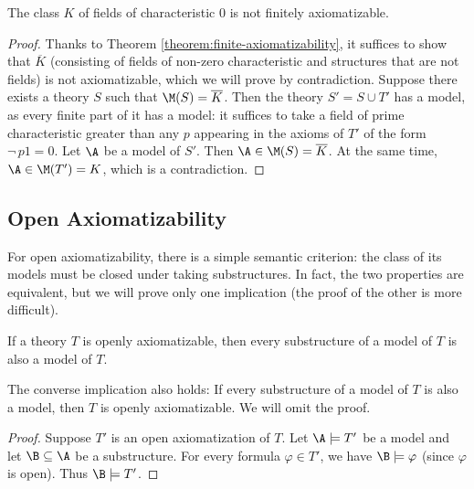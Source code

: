 \begin{proposition}
The class $K$ of fields of characteristic $0$ is not finitely axiomatizable.   
\end{proposition}
\begin{proof}
Thanks to Theorem \ref{theorem:finite-axiomatizability}, it suffices to show that $\overline{K}$ (consisting of fields of non-zero characteristic and structures that are not fields) is not axiomatizable, which we will prove by contradiction. Suppose there exists a theory $S$ such that $\M(S) = \overline{K}$. Then the theory 
$S' = S \cup T'$ has a model, as every finite part of it has a model: it suffices to take a field of prime characteristic greater than any $p$ appearing in the axioms of $T'$ of the form $\neg\, p1 = 0$. Let $\A$ be a model of $S'$. Then $\A \in \M(S) = \overline{K}$. At the same time, $\A \in \M(T') = K$, which is a contradiction.
\end{proof}

\subsection{Open Axiomatizability}

For open axiomatizability, there is a simple semantic criterion: the class of its models must be closed under taking substructures. In fact, the two properties are equivalent, but we will prove only one implication (the proof of the other is more difficult).

\begin{theorem}\label{theorem:open-axiomatizability}
If a theory $T$ is openly axiomatizable, then every substructure of a model of $T$ is also a model of $T$.   
\end{theorem}

\begin{remark}
    The converse implication also holds: If every substructure of a model of $T$ is also a model, then $T$ is openly axiomatizable. We will omit the proof.
\end{remark}

\begin{proof}
Suppose $T'$ is an open axiomatization of $T$. Let $\A \models T'$ be a model and let $\B \subseteq \A$ be a substructure. For every formula $\varphi \in T'$, we have $\B \models \varphi$ (since $\varphi$ is open). Thus $\B \models T'$.  
\end{proof}

